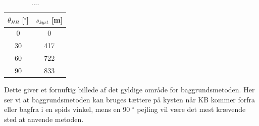 \documentclass[%
 reprint,
nofootinbib,
aps,
]{revtex4-1}
\begin{document}
\begin{table}[H]
 \begin{center}
 \caption{....}
 \begin{tabular}{|c|c|} \hline
 $\theta_{HB}$ [$^{\circ}$] & $s_{kyst}$ [m]  \\ \hline
 0 & 0 \\ \hline
 30 & 417 \\ \hline
 60 & 722  \\ \hline
 90 & 833 \\ \hline
 \end{tabular}
 \label{tab:valid_area}
 \end{center}
\end{table}
Dette giver et fornuftig billede af det gyldige område for baggrundsmetoden. Her ser vi at baggrundsmetoden kan bruges tættere på kysten når KB kommer forfra eller bagfra i en spids vinkel, mens en 90 $^{\circ}$ pejling vil være det mest krævende sted at anvende metoden.




\end{document}
